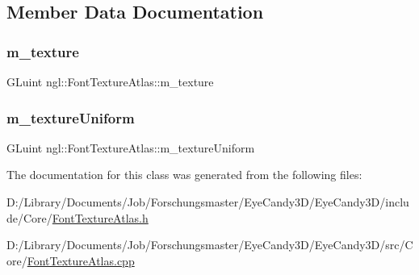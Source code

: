 \subsection{Member Data Documentation}
\mbox{\label{classngl_1_1_font_texture_atlas_a43e6121a1bb6a46a02c7b32ccedf51e0}} 
\subsubsection{\texorpdfstring{m\+\_\+texture}{m\_texture}}
{\footnotesize\ttfamily G\+Luint ngl\+::\+Font\+Texture\+Atlas\+::m\+\_\+texture}

\mbox{\label{classngl_1_1_font_texture_atlas_ac402f468dfb1a71c4819fcb1a51b415e}} 
\subsubsection{\texorpdfstring{m\+\_\+texture\+Uniform}{m\_textureUniform}}
{\footnotesize\ttfamily G\+Luint ngl\+::\+Font\+Texture\+Atlas\+::m\+\_\+texture\+Uniform}



The documentation for this class was generated from the following files\+:\begin{DoxyCompactItemize}
\item 
D\+:/\+Library/\+Documents/\+Job/\+Forschungsmaster/\+Eye\+Candy3\+D/\+Eye\+Candy3\+D/include/\+Core/\mbox{\hyperlink{_font_texture_atlas_8h}{Font\+Texture\+Atlas.\+h}}\item 
D\+:/\+Library/\+Documents/\+Job/\+Forschungsmaster/\+Eye\+Candy3\+D/\+Eye\+Candy3\+D/src/\+Core/\mbox{\hyperlink{_font_texture_atlas_8cpp}{Font\+Texture\+Atlas.\+cpp}}\end{DoxyCompactItemize}
